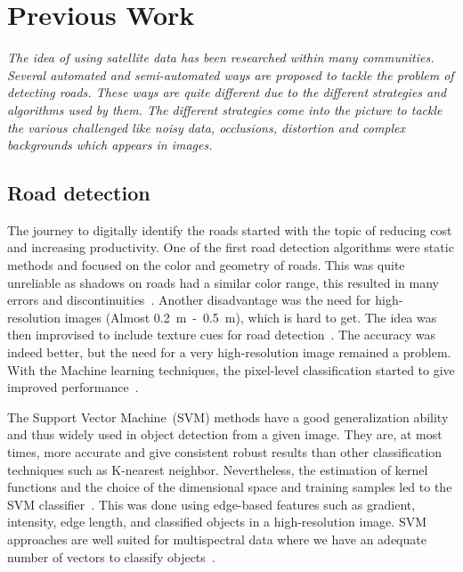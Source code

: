 \chapter{Previous Work}\label{chapt:previous}
\textit{The idea of using satellite data has been researched within many communities. Several automated and semi-automated ways are proposed to tackle the problem of detecting roads. These ways are quite different due to the different strategies and algorithms used by them. The different strategies come into the picture to tackle the various challenged like noisy data, occlusions, distortion and complex backgrounds which appears in images.}

\section{Road detection}
The journey to digitally identify the roads started with the topic of reducing cost and increasing productivity. One of the first road detection algorithms were static methods and focused on the color and geometry of roads. This was quite unreliable as shadows on roads had a similar color range, this resulted in many errors and discontinuities~\cite{Detecting_interections_using_color,Detecting_roads_using_color}. Another disadvantage was the need for high-resolution images (Almost 0.2~m~-~0.5~m), which is hard to get. The idea was then improvised to include texture cues for road detection~\cite{using_texture_for_road_detection,baumgartner1999automatic}. The accuracy was indeed better, but the need for a very high-resolution image remained a problem. With the Machine learning techniques, the pixel-level classification started to give improved performance~\cite{road_detection_using_neural_nets_SVM,road_detection_using_env_learning,road_detection_using_SVM_online_learning}.

The Support Vector Machine~(SVM) methods have a good generalization ability and thus widely used in object detection from a given image. They are, at most times, more accurate and give consistent robust results than other classification techniques such as K-nearest neighbor. Nevertheless, the estimation of kernel functions and the choice of the dimensional space and training samples led to the SVM classifier~\cite{YagerSowmya2003,melgani2004classification}. This was done using edge-based features such as gradient, intensity, edge length, and classified objects in a high-resolution image. SVM approaches are well suited for multispectral data where we have an adequate number of vectors to classify objects~\cite{Simler2011}.

